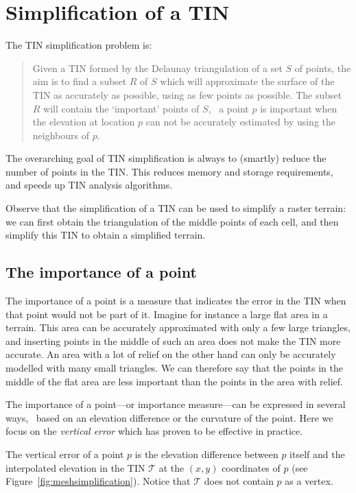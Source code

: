 %
\section{Simplification of a TIN}
\label{sec:tin-simpl}

The TIN simplification problem is:
\begin{quote}
	Given a TIN formed by the Delaunay triangulation of a set $S$ of points, the aim is to find a subset $R$ of $S$ which will approximate the surface of the TIN as accurately as possible, using as few points as possible. The subset $R$ will contain the `important' points of $S$, \ie\ a point $p$ is important when the elevation at location $p$ can not be accurately estimated by using the neighbours of $p$.
\end{quote}

The overarching goal of TIN simplification is always to (smartly) reduce the number of points in the TIN\@.
This reduces memory and storage requirements, and speeds up TIN analysis algorithms.

Observe that the simplification of a TIN can be used to simplify a raster terrain: we can first obtain the triangulation of the middle points of each cell, and then simplify this TIN to obtain a simplified terrain.


\subsection{The importance of a point}
The importance of a point is a measure that indicates the error in the TIN when that point would not be part of it. 
Imagine for instance a large flat area in a terrain. 
This area can be accurately approximated with only a few large triangles, and inserting points in the middle of such an area does not make the TIN more accurate. 
An area with a lot of relief on the other hand can only be accurately modelled with many small triangles. 
We can therefore say that the points in the middle of the flat area are less important than the points in the area with relief.

The importance of a point---or importance measure---can be expressed in several ways, \eg\  based on an elevation difference or the curvature of the point. Here we focus on the \emph{vertical error} which has proven to be effective in practice.

The vertical error of a point $p$ is the elevation difference between $p$ itself and the interpolated elevation in the TIN $\mathcal{T}$ at the $(x,y)$ coordinates of $p$ (see Figure~\ref{fig:meshsimplification}).  
Notice that $\mathcal{T}$ does not contain $p$ as a vertex.

